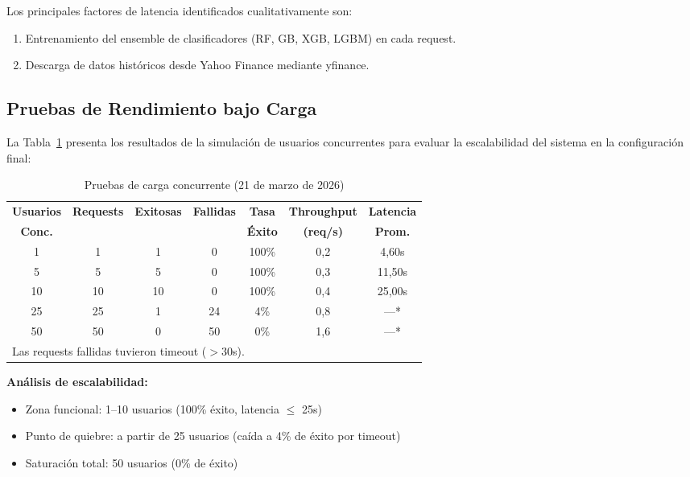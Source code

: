   Los principales factores de latencia identificados cualitativamente son:
  \begin{enumerate}
      \item Entrenamiento del ensemble de clasificadores (RF, GB, XGB, LGBM) en cada request.
      \item Descarga de datos históricos desde Yahoo Finance mediante yfinance.
  \end{enumerate}

\subsection{Pruebas de Rendimiento bajo Carga}

  La Tabla~\ref{tab:carga} presenta los resultados de la simulación de usuarios concurrentes
  para evaluar la escalabilidad del sistema en la configuración final:

\begin{table}[H]
\centering
\caption{Pruebas de carga concurrente (21 de marzo de 2026)}
\label{tab:carga}
\small
\begin{tabular}{ccccccc}
\toprule
\textbf{Usuarios} & \textbf{Requests} & \textbf{Exitosas} & \textbf{Fallidas} & \textbf{Tasa} & \textbf{Throughput} & \textbf{Latencia} \\
\textbf{Conc.} & & & & \textbf{Éxito} & \textbf{(req/s)} & \textbf{Prom.} \\
\midrule
1  & 1  & 1  & 0  & 100\% & 0{,}2 & 4{,}60s \\
5  & 5  & 5  & 0  & 100\% & 0{,}3 & 11{,}50s \\
10 & 10 & 10 & 0  & 100\% & 0{,}4 & 25{,}00s \\
25 & 25 & 1  & 24 & 4\%   & 0{,}8 & ---* \\
50 & 50 & 0  & 50 & 0\%   & 1{,}6 & ---* \\
\bottomrule
\multicolumn{7}{l}{\small *Las requests fallidas tuvieron timeout ($>$30s).}
\end{tabular}
\end{table}

\textbf{Análisis de escalabilidad:}

  \begin{itemize}
      \item Zona funcional: 1--10 usuarios (100\% éxito, latencia $\leq$ 25s)
      \item Punto de quiebre: a partir de 25 usuarios (caída a 4\% de éxito por timeout)
      \item Saturación total: 50 usuarios (0\% de éxito)
  \end{itemize}

